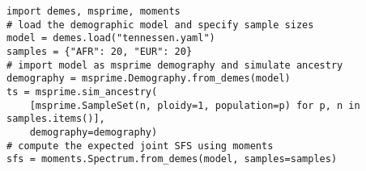 \documentclass{article}
\begin{document}
\begin{verbatim}
import demes, msprime, moments
# load the demographic model and specify sample sizes
model = demes.load("tennessen.yaml")
samples = {"AFR": 20, "EUR": 20}
# import model as msprime demography and simulate ancestry
demography = msprime.Demography.from_demes(model)
ts = msprime.sim_ancestry(
    [msprime.SampleSet(n, ploidy=1, population=p) for p, n in samples.items()],
    demography=demography)
# compute the expected joint SFS using moments
sfs = moments.Spectrum.from_demes(model, samples=samples)
\end{verbatim}
\end{document}
